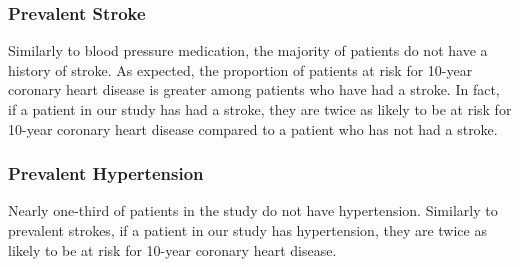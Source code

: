 \documentclass[10pt]{article}
\begin{document}
\subsubsection*{Prevalent Stroke}

Similarly to blood pressure medication, the majority of patients do not have a history of stroke. As expected, the proportion of patients at risk for 10-year coronary heart disease is greater among patients who have had a stroke. In fact, if a patient in our study has had a stroke, they are twice as likely to be at risk for 10-year coronary heart disease compared to a patient who has not had a stroke.

\begin{figure}[hbt!]
\hspace*{\fill}
\centering
{}\hspace{2em}%
%
\hspace*{\fill}
\end{figure}


\subsubsection*{Prevalent Hypertension}

Nearly one-third of patients in the study do not have hypertension. Similarly to prevalent strokes, if a patient in our study has hypertension, they are twice as likely to be at risk for 10-year coronary heart disease. 
\end{document}
